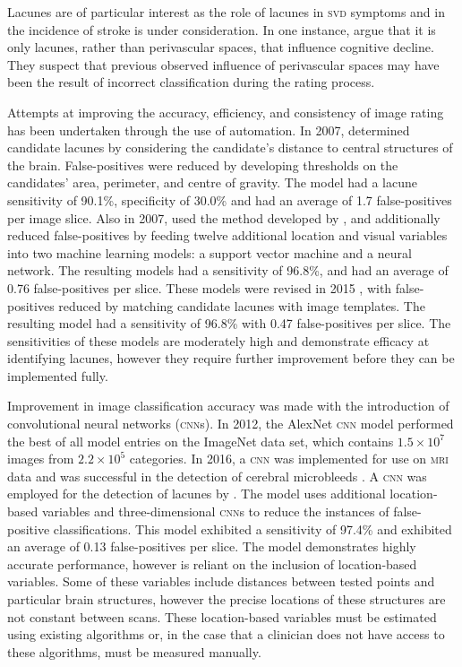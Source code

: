 Lacunes are of particular interest as the role of lacunes in \textsc{svd} symptoms and in the incidence of stroke is under consideration. In one instance, \cite{BenjaminJ.Philip2018LIbN} argue that it is only lacunes, rather than perivascular spaces, that influence cognitive decline. They suspect that previous observed influence of perivascular spaces may have been the result of incorrect classification during the rating process.

Attempts at improving the accuracy, efficiency, and consistency of image rating has been undertaken through the use of automation. In 2007, \cite{Yokoyama2007} determined candidate lacunes by considering the candidate's distance to central structures of the brain. False-positives were reduced by developing thresholds on the candidates' area, perimeter, and centre of gravity. The model had a lacune sensitivity of 90.1\%, specificity of 30.0\% and had an average of 1.7 false-positives per image slice. Also in 2007, \cite{Uchiyama20071554, Uchiyama2007b} used the method developed by \cite{Yokoyama2007}, and additionally reduced false-positives by feeding twelve additional location and visual variables into two machine learning models: a support vector machine and a neural network. The resulting models had a sensitivity of 96.8\%, and had an average of 0.76 false-positives per slice. These models were revised in 2015 \citep{Uchiyama2015}, with false-positives reduced by matching candidate lacunes with image templates. The resulting model had a sensitivity of 96.8\% with 0.47 false-positives per slice. The sensitivities of these models are moderately high and demonstrate efficacy at identifying lacunes, however they require further improvement before they can be implemented fully.

Improvement in image classification accuracy was made with the introduction of convolutional neural networks (\textsc{cnn}s). In 2012, the AlexNet \textsc{cnn} model \citep{AlexNet2012} performed the best of all model entries on the ImageNet data set, which contains $1.5\times10^{7}$ images from $2.2\times10^5$ categories. In 2016, a \textsc{cnn} was implemented for use on \textsc{mri} data and was successful in the detection of cerebral microbleeds \citep{DouQ.2016ADoC}. A \textsc{cnn} was employed for the detection of lacunes by \cite{GhafoorianM.2017Dml3}. The model uses additional location-based variables and three-dimensional \textsc{cnn}s to reduce the instances of false-positive classifications. This model exhibited a sensitivity of 97.4\% and exhibited an average of 0.13 false-positives per slice. The model demonstrates highly accurate performance, however is reliant on the inclusion of location-based variables. Some of these variables include distances between tested points and particular brain structures, however the precise locations of these structures are not constant between scans. These location-based variables must be estimated using existing algorithms or, in the case that a clinician does not have access to these algorithms, must be measured manually. 

